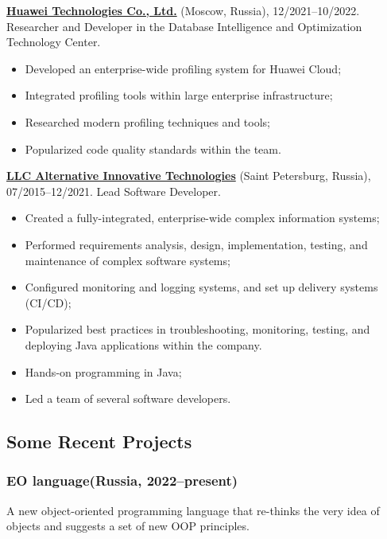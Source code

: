 \documentclass{vl}
\begin{document}
    \textbf{\href{https://www.huawei.com}{Huawei Technologies Co., Ltd.}} (Moscow, Russia), 12/2021--10/2022.\newline
    Researcher and Developer in the Database Intelligence and Optimization Technology Center.

    \begin{itemize}
        \item Developed an enterprise-wide profiling system for Huawei Cloud;
        \item Integrated profiling tools within large enterprise infrastructure;
        \item Researched modern profiling techniques and tools;
        \item Popularized code quality standards within the team.
    \end{itemize}

    \textbf{\href{https://altinntech.com/en/}{LLC Alternative Innovative Technologies}} (Saint Petersburg, Russia),
    07/2015--12/2021.
    Lead Software Developer.

    \begin{itemize}
        \item Created a fully-integrated, enterprise-wide complex information systems;
        \item Performed requirements analysis, design, implementation, testing, and maintenance of complex software
        systems;
        \item Configured monitoring and logging systems, and set up delivery systems (CI/CD);
        \item Popularized best practices in troubleshooting, monitoring, testing, and deploying Java applications
        within the company.
        \item Hands-on programming in Java;
        \item Led a team of several software developers.
    \end{itemize}

    \subsection*{Some Recent Projects}

    \subsubsection*{EO language(Russia, 2022--present)}

    A new object-oriented
    programming language that re-thinks the very idea of objects
    and suggests a set of new OOP principles.
\end{document}
